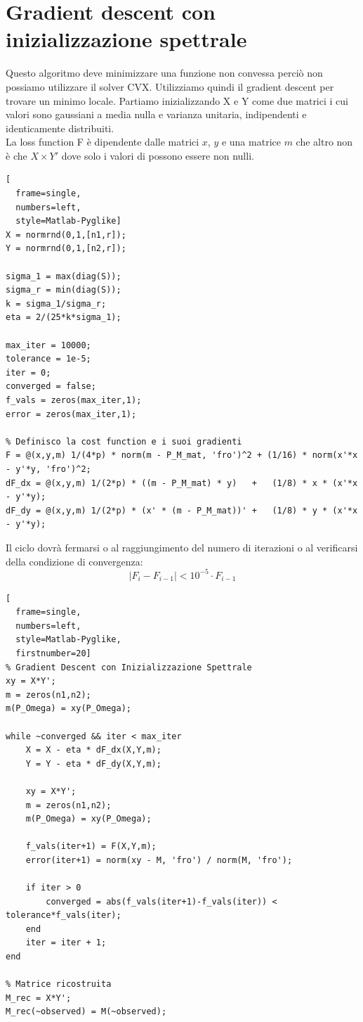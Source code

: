 \documentclass[12pt,a4paper]{report}
\begin{document}
\newpage

\section{Gradient descent con inizializzazione spettrale}

Questo algoritmo deve minimizzare una funzione non convessa perciò
non possiamo utilizzare il solver CVX.
Utilizziamo quindi il gradient descent per trovare un minimo locale.
Partiamo inizializzando X e Y come due matrici i cui valori
sono gaussiani a media nulla e varianza unitaria, indipendenti
e identicamente distribuiti.\\
La loss function F è dipendente dalle matrici
$x$, $y$ e una matrice $m$ che altro non è che $X\times Y'$
dove solo i valori di  possono essere non nulli.\\

\begin{lstlisting}[
  frame=single,
  numbers=left,
  style=Matlab-Pyglike]
X = normrnd(0,1,[n1,r]);
Y = normrnd(0,1,[n2,r]);

sigma_1 = max(diag(S));
sigma_r = min(diag(S));
k = sigma_1/sigma_r;
eta = 2/(25*k*sigma_1);

max_iter = 10000;
tolerance = 1e-5;
iter = 0;
converged = false;
f_vals = zeros(max_iter,1);
error = zeros(max_iter,1);

% Definisco la cost function e i suoi gradienti
F = @(x,y,m) 1/(4*p) * norm(m - P_M_mat, 'fro')^2 + (1/16) * norm(x'*x - y'*y, 'fro')^2;
dF_dx = @(x,y,m) 1/(2*p) * ((m - P_M_mat) * y)   +   (1/8) * x * (x'*x - y'*y);
dF_dy = @(x,y,m) 1/(2*p) * (x' * (m - P_M_mat))' +   (1/8) * y * (x'*x - y'*y);

\end{lstlisting}
Il ciclo dovrà fermarsi o al raggiungimento del numero di
iterazioni  o al verificarsi
della condizione di convergenza:
$$ |F_i - F_{i-1}| < 10^{-5} \cdot F_{i-1} $$

\begin{lstlisting}[
  frame=single,
  numbers=left,
  style=Matlab-Pyglike,
  firstnumber=20]
% Gradient Descent con Inizializzazione Spettrale
xy = X*Y';
m = zeros(n1,n2);
m(P_Omega) = xy(P_Omega);

while ~converged && iter < max_iter
    X = X - eta * dF_dx(X,Y,m);
    Y = Y - eta * dF_dy(X,Y,m);

    xy = X*Y';
    m = zeros(n1,n2);
    m(P_Omega) = xy(P_Omega);

    f_vals(iter+1) = F(X,Y,m);
    error(iter+1) = norm(xy - M, 'fro') / norm(M, 'fro');

    if iter > 0
        converged = abs(f_vals(iter+1)-f_vals(iter)) < tolerance*f_vals(iter);
    end
    iter = iter + 1;
end

% Matrice ricostruita
M_rec = X*Y';
M_rec(~observed) = M(~observed);
\end{lstlisting}
\end{document}
